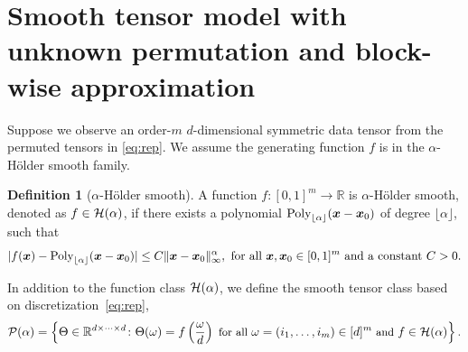\documentclass{article}
\theoremstyle{definition}
\newtheorem{defn}{Definition}
\begin{document}
\section{Smooth tensor model with unknown permutation  and block-wise approximation}\label{sec:md}
\vspace{-.1cm}
Suppose we observe an order-$m$ $d$-dimensional symmetric data tensor from the permuted tensors in \eqref{eq:rep}.
We assume the generating function $f$ is in the $\alpha$-H\"older smooth family. 
\begin{defn}[$\alpha$-H\"older smooth]
A function $f\colon [0,1]^m\rightarrow \mathbb{R}$ is $\alpha$-H\"older smooth, denoted as $f\in\mathcal{H}(\alpha)$, if there exists a polynomial $\text{Poly}_{\lfloor \alpha\rfloor}(\bm x-\bm x_0)$ of degree  $\lfloor \alpha\rfloor$, such that 
\begin{align}\label{eq:defn}
    |f(\bm x) - \text{Poly}_{\lfloor \alpha\rfloor}(\bm x-\bm x_0)| \leq C\|\bm x-\bm x_0\|_\infty^\alpha, \text{ for all $\bm x,\bm x_0\in [0,1]^m$ and a constant $C>0.$}
\end{align}
\end{defn}

In addition to the function class $\mathcal{H}(\alpha)$, we define the smooth tensor class based on discretization~\eqref{eq:rep}, 
\begin{equation}\label{eq:function}
{\small \tP(\alpha)= \left\{\Theta\in\mathbb{R}^{d\times \cdots \times d} \colon\Theta(\omega) = f\left({\omega \over d}\right) \text{ for all } \omega=(i_1,\ldots,i_m) \in[d]^m \text{ and } f\in\tH(\alpha)\right\}.}
\end{equation}
\end{document}
